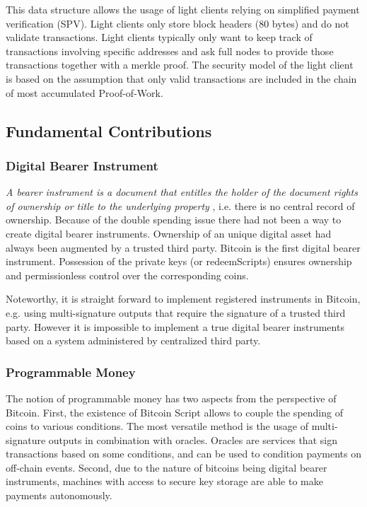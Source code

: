   This data structure allows the usage of light clients relying on simplified payment verification (SPV). Light clients only store block headers (80 bytes) and do not validate transactions. Light clients typically only want to keep track of transactions involving specific addresses and ask full nodes to provide those transactions together with a merkle proof. The security model of the light client is based on the assumption that only valid transactions are included in the chain of most accumulated Proof-of-Work.  
 

\subsection{Fundamental Contributions}
\label{sec:btc_cont}

\subsubsection{Digital Bearer Instrument}

\emph{A bearer instrument is a document that entitles the holder of the document rights of ownership or title to the underlying property} \parencite{bearer}, i.e. there is no central record of ownership. Because of the double spending issue there had not been a way to create digital bearer instruments. Ownership of an unique digital asset had always been augmented by a trusted third party. Bitcoin is the first digital bearer instrument. Possession of the private keys (or redeemScripts) ensures ownership and permissionless control over the corresponding coins.

Noteworthy, it is straight forward to implement registered instruments in Bitcoin, e.g. using multi-signature outputs that require the signature of a trusted third party. However it is impossible to implement a true digital bearer instruments based on a system administered by centralized third party.

\subsubsection{Programmable Money}

The notion of programmable money has two aspects from the perspective of Bitcoin. First, the existence of Bitcoin Script allows to couple the spending of coins to various conditions. The most versatile method is the usage of multi-signature outputs in combination with oracles. Oracles are services that sign transactions based on some conditions, and can be used to condition payments on off-chain events. Second, due to the nature of bitcoins being digital bearer instruments, machines with access to secure key storage are able to make payments autonomously.  

